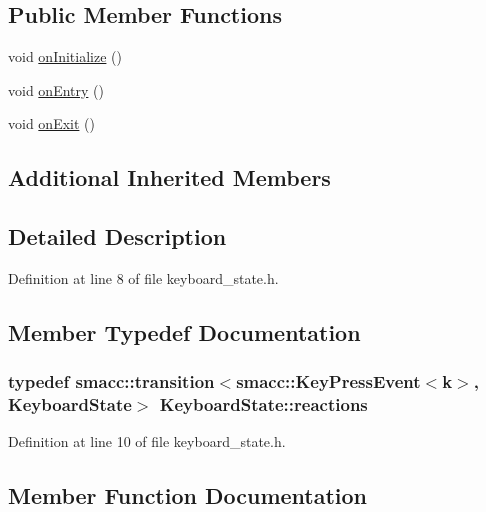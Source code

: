 \subsection*{Public Member Functions}
\begin{DoxyCompactItemize}
\item 
void \hyperlink{structKeyboardState_ab8bbd42dc0b4916ce2ebd2e5cbb772a6}{on\+Initialize} ()
\item 
void \hyperlink{structKeyboardState_a6c914773612dfabf146243cea8decfd0}{on\+Entry} ()
\item 
void \hyperlink{structKeyboardState_a365567740556b32391d90561345c51a8}{on\+Exit} ()
\end{DoxyCompactItemize}
\subsection*{Additional Inherited Members}


\subsection{Detailed Description}


Definition at line 8 of file keyboard\+\_\+state.\+h.



\subsection{Member Typedef Documentation}
\subsubsection[{\texorpdfstring{reactions}{reactions}}]{\setlength{\rightskip}{0pt plus 5cm}typedef {\bf smacc\+::transition}$<${\bf smacc\+::\+Key\+Press\+Event}$<$\textquotesingle{}k\textquotesingle{}$>$, {\bf Keyboard\+State}$>$ {\bf Keyboard\+State\+::reactions}}\hypertarget{structKeyboardState_aae882991e7825970266b0a1bd62863b9}{}\label{structKeyboardState_aae882991e7825970266b0a1bd62863b9}


Definition at line 10 of file keyboard\+\_\+state.\+h.



\subsection{Member Function Documentation}

